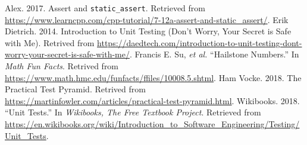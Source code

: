 \documentclass{utap}
\begin{document}
    \begin{thebibliography}{9}
    \begin{latinitems}
     Alex. 2017. Assert and \lstinline{static_assert}. Retrieved from \url{https://www.learncpp.com/cpp-tutorial/7-12a-assert-and-static_assert/}.
     Erik Dietrich. 2014. Introduction to Unit Testing (Don’t Worry, Your Secret is Safe with Me). Retrived from \url{https://daedtech.com/introduction-to-unit-testing-dont-worry-your-secret-is-safe-with-me/}.
     Francis E. Su, \textit{et al.} ``Hailstone Numbers.'' In \textit{Math Fun Facts}. Retrived from \url{https://www.math.hmc.edu/funfacts/ffiles/10008.5.shtml}.
     Ham Vocke. 2018. The Practical Test Pyramid. Retrived from \url{https://martinfowler.com/articles/practical-test-pyramid.html}.
     Wikibooks. 2018. ``Unit Tests.'' In \textit{Wikibooks, The Free Textbook Project}. Retrieved from \url{https://en.wikibooks.org/wiki/Introduction_to_Software_Engineering/Testing/Unit_Tests}.
    \end{latinitems}
    \end{thebibliography}
\end{document}
